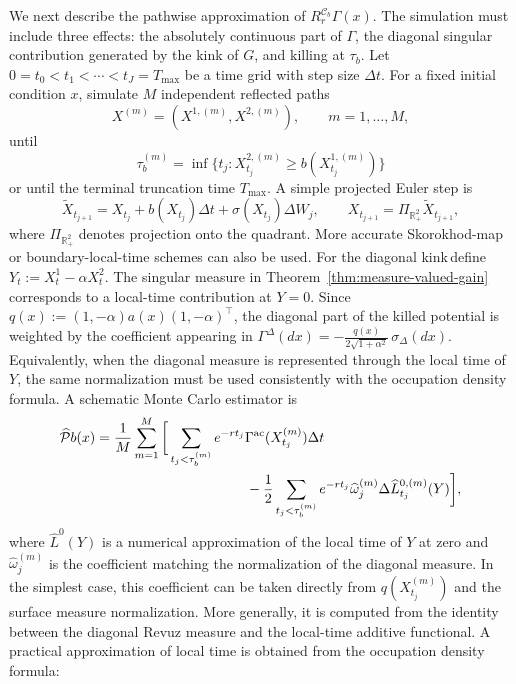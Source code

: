 \documentclass[pdflatex,sn-mathphys-num]{sn-jnl}
\theoremstyle{plain}
\theoremstyle{definition}
\theoremstyle{remark}
\numberwithin{equation}{section}
\begin{document}
We next describe the pathwise approximation of 
$R_r^{\mathcal C_b}\Gamma(x)$. 
The simulation must include three effects: the absolutely continuous part of \(\Gamma\), the diagonal singular contribution generated by the kink of \(G\), and killing at \(\tau_b\). Let \(0=t_0<t_1<\cdots<t_J=T_{\max}\) be a time grid with step size \(\Delta t\). For a fixed initial condition \(x\), simulate \(M\) independent reflected paths 
\[ 
X^{(m)}=(X^{1,(m)},X^{2,(m)}), \qquad m=1,\ldots,M, 
\] 
until 
\[ 
\tau_b^{(m)} = \inf\{t_j:X_{t_j}^{2,(m)}\ge b(X_{t_j}^{1,(m)})\} 
\] 
or until the terminal truncation time \(T_{\max}\). A simple projected Euler step is 
\begin{equation} \label{eq:projected-euler} 
\widetilde X_{t_{j+1}} = X_{t_j} + b(X_{t_j})\Delta t + \sigma(X_{t_j})\Delta W_j, \qquad X_{t_{j+1}} = \Pi_{\mathbb R_+^2}\widetilde X_{t_{j+1}}, 
\end{equation} 
where \(\Pi_{\mathbb R_+^2}\) denotes projection onto the quadrant. More accurate Skorokhod-map or boundary-local-time schemes can also be used. For the diagonal kink\,define 
$Y_t:=X_t^1-\alpha X_t^2 $. 
The singular measure in Theorem~\ref{thm:measure-valued-gain} corresponds to a local-time contribution at \(Y=0\). Since 
$q(x):=(1,-\alpha)a(x)(1,-\alpha)^\top$, 
the diagonal part of the killed potential is weighted by the coefficient appearing in 
$\displaystyle \Gamma^\Delta(dx) = - \frac{q(x)}{2\sqrt{1+\alpha^2}}\,\sigma_\Delta(dx)$. 
Equivalently, when the diagonal measure is represented through the local time of \(Y\), the same normalization must be used consistently with the occupation density formula. A schematic Monte Carlo estimator is 
\begin{align} \label{eq:MC-estimator} 
\widehat{\mathcal P}b(x) &= \frac1M \sum_{m=1}^M \bigg[ \sum_{t_j<\tau_b^{(m)}} e^{-rt_j} \Gamma^{\rm ac}(X_{t_j}^{(m)})\Delta t \nonumber\\ 
&\hspace{3.8cm} - \frac12 \sum_{t_j<\tau_b^{(m)}} e^{-rt_j} \widehat \omega_j^{(m)} \Delta \widehat L_{t_j}^{0,(m)}(Y) \bigg], 
\end{align}
where \(\widehat L^0(Y)\) is a numerical approximation of the local time of \(Y\) at zero and \(\widehat\omega_j^{(m)}\) is the coefficient matching the normalization of the diagonal measure. In the simplest case, this coefficient can be taken directly from \(q(X_{t_j}^{(m)})\) and the surface measure normalization. More generally, it is computed from the identity between the diagonal Revuz measure and the local-time additive functional. A practical approximation of local time is obtained from the occupation density formula: 
\end{document}
